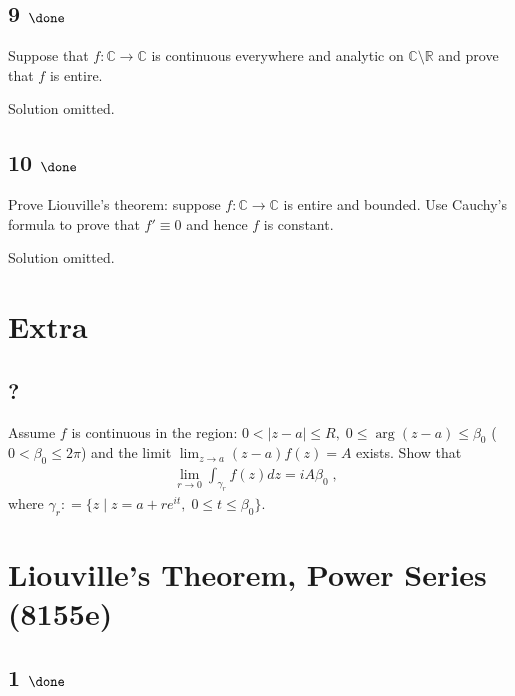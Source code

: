 \hypertarget{done-1}{%
\subsection{\texorpdfstring{9
\(\done\)}{9 \textbackslash done}}\label{done-1}}

Suppose that \(f: {\mathbb{C}}\to{\mathbb{C}}\) is continuous everywhere
and analytic on \({\mathbb{C}}\setminus {\mathbb{R}}\) and prove that
\(f\) is entire.


Solution omitted.

\hypertarget{done-2}{%
\subsection{\texorpdfstring{10
\(\done\)}{10 \textbackslash done}}\label{done-2}}

Prove Liouville's theorem: suppose \(f:{\mathbb{C}}\to{\mathbb{C}}\) is
entire and bounded. Use Cauchy's formula to prove that \(f'\equiv 0\)
and hence \(f\) is constant.

Solution omitted.

\hypertarget{extra}{%
\section{Extra}\label{extra}}

\hypertarget{section-5}{%
\subsection{?}\label{section-5}}

Assume \(f\) is continuous in the region:
\(0< |z-a| \leq R, \; 0 \leq \arg(z-a) \leq \beta_0\)
(\(0 < \beta_0 \leq 2 \pi\)) and the limit
\(\displaystyle \lim_{z \rightarrow a} (z-a) f(z) = A\) exists. Show
that
\begin{align*}\lim_{r \rightarrow 0} \int_{\gamma_r} f(z) dz  = i A \beta_0 \; , \; \;\end{align*}
where
\(\gamma_r : = \{ z \; | \; z = a + r e^{it}, \; 0 \leq t \leq \beta_0 \}.\)

\hypertarget{liouvilles-theorem-power-series-8155e}{%
\section{Liouville's Theorem, Power Series
(8155e)}\label{liouvilles-theorem-power-series-8155e}}

\hypertarget{done-3}{%
\subsection{\texorpdfstring{1
\(\done\)}{1 \textbackslash done}}\label{done-3}}

